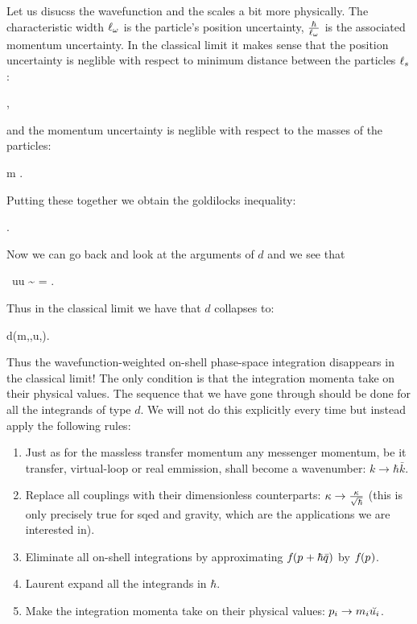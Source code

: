 \documentclass[
  10pt,
  a4paper,
  DIV=11,
  numbers=noendperiod,
  oneside]{scrreprt}
\providecommand{\tightlist}{%
  \setlength{\itemsep}{0pt}\setlength{\parskip}{0pt}}\usepackage{longtable,booktabs,array}
\let\[\relax \let\]\relax %
\DeclareRobustCommand{\[}{\begin{equation}}
\DeclareRobustCommand{\]}{\end{equation}}
\begin{document}
Let us disucss the wavefunction and the scales a bit more physically.
The characteristic width \(\wfwidth\) is the particle's position
uncertainty, \(\frac{\hbar}{\wfwidth}\) is the associated momentum
uncertainty. In the classical limit it makes sense that the position
uncertainty is neglible with respect to minimum distance between the
particles \(\scatlen\):

\[
\wfwidth\ll \scatlen,
\]

and the momentum uncertainty is neglible with respect to the masses of
the particles:

\[
\frac{\hbar}{\wfwidth}\ll m \implies \comptlen\ll \wfwidth.
\]

Putting these together we obtain the goldilocks inequality:

\[
\comptlen\ll\wfwidth\ll\scatlen.
\]

Now we can go back and look at the arguments of \(d\) and we see that

\[
\scatlen\, \tw \cdot u\gg\wfwidth \tw \cdot u \sim \sqrt{\xi} =   \frac{\comptlen}{\wfwidth}\gg\frac{\comptlen}{\scatlen}.
\]

Thus in the classical limit we have that \(d\) collapses to:

\[
d(m,\xi,u,\tm)\propto{}.
\]

Thus the wavefunction-weighted on-shell phase-space integration
disappears in the classical limit! The only condition is that the
integration momenta take on their physical values. The sequence that we
have gone through should be done for all the integrands of type \(d\).
We will not do this explicitly every time but instead apply the
following rules:

\begin{enumerate}
\def\labelenumi{\arabic{enumi}.}
\tightlist
\item
  Just as for the massless transfer momentum any messenger momentum, be
  it transfer, virtual-loop or real emmission, shall become a
  wavenumber: \(k\to \hbar \bar{k}\).
\item
  Replace all couplings with their dimensionless counterparts:
  \(\coupling\to \frac{\coupling}{\sqrt{\hbar} }\) (this is only
  precisely true for \gls{sqed} and gravity, which are the applications
  we are interested in).
\item
  Eliminate all on-shell integrations by approximating
  \(\wf(\emom+\hbar\tw)\) by \(\wf(\emom)\).
\item
  Laurent expand all the integrands in \(\hbar\).
\item
  Make the integration momenta take on their physical values:
  \(\emom[i]\to \mass[i]\cls{\vel[i]}\).
\end{enumerate}
\end{document}
